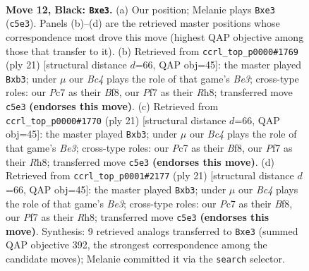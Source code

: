 \documentclass[11pt]{article}
\begin{document}
\clearpage

\begin{figure}[p]\centering
\begin{subfigure}{0.46\textwidth}\centering
\resizebox{\linewidth}{!}{%
\newchessgame
\chessboard[
  setfen={2kr2nr/ppp2ppp/2p1bq2/2b5/8/2P1B3/PP2QPPP/R3KB1R b KQ - 2 12},
  showmover=false,
  pgfstyle=straightmove, color=movearrow, markmove={c5-e3}
]}
\caption{}
\end{subfigure}\hfill
\begin{subfigure}{0.46\textwidth}\centering
\resizebox{\linewidth}{!}{%
\newchessgame
\chessboard[
  setfen={r3kb1r/pp2pppp/1n1qb3/8/3P4/1B6/PP3PPP/RNBQ1RK1 b kq - 0 11},
  showmover=false,
  pgfstyle=straightmove, color=movearrow, markmove={e6-b3}
]}
\caption{}
\end{subfigure}
\\[4pt]
\begin{subfigure}{0.46\textwidth}\centering
\resizebox{\linewidth}{!}{%
\newchessgame
\chessboard[
  setfen={r3kb1r/pp2pppp/1n1qb3/8/3P4/1B6/PP3PPP/RNBQ1RK1 b kq - 0 11},
  showmover=false,
  pgfstyle=straightmove, color=movearrow, markmove={e6-b3}
]}
\caption{}
\end{subfigure}\hfill
\begin{subfigure}{0.46\textwidth}\centering
\resizebox{\linewidth}{!}{%
\newchessgame
\chessboard[
  setfen={r3kb1r/pp2pppp/1n1qb3/8/3P4/1B6/PP3PPP/RNBQ1RK1 b kq - 2 11},
  showmover=false,
  pgfstyle=straightmove, color=movearrow, markmove={e6-b3}
]}
\caption{}
\end{subfigure}
\caption{\textbf{Move 12, Black: \texttt{Bxe3}.} (a) Our position; Melanie plays \texttt{Bxe3} (\texttt{c5e3}). Panels (b)--(d) are the retrieved master positions whose correspondence most drove this move (highest QAP objective among those that transfer to it). (b) Retrieved from \texttt{ccrl\_top\_p0000\#1769} (ply 21) [structural distance $d$=66, QAP obj=45]: the master played \texttt{Bxb3}; under $\mu$ our \emph{Bc4} plays the role of that game's \emph{Be3}; cross-type roles: our \emph{P}c7 as their \emph{B}f8, our \emph{P}f7 as their \emph{R}h8; transferred move \texttt{c5e3} \textbf{(endorses this move)}. (c) Retrieved from \texttt{ccrl\_top\_p0000\#1770} (ply 21) [structural distance $d$=66, QAP obj=45]: the master played \texttt{Bxb3}; under $\mu$ our \emph{Bc4} plays the role of that game's \emph{Be3}; cross-type roles: our \emph{P}c7 as their \emph{B}f8, our \emph{P}f7 as their \emph{R}h8; transferred move \texttt{c5e3} \textbf{(endorses this move)}. (d) Retrieved from \texttt{ccrl\_top\_p0001\#2177} (ply 21) [structural distance $d$=66, QAP obj=45]: the master played \texttt{Bxb3}; under $\mu$ our \emph{Bc4} plays the role of that game's \emph{Be3}; cross-type roles: our \emph{P}c7 as their \emph{B}f8, our \emph{P}f7 as their \emph{R}h8; transferred move \texttt{c5e3} \textbf{(endorses this move)}. Synthesis: 9 retrieved analogs transferred to \texttt{Bxe3} (summed QAP objective 392, the strongest correspondence among the candidate moves); Melanie committed it via the \texttt{search} selector.}
\label{fig:thought-m23}
\end{figure}
\end{document}
